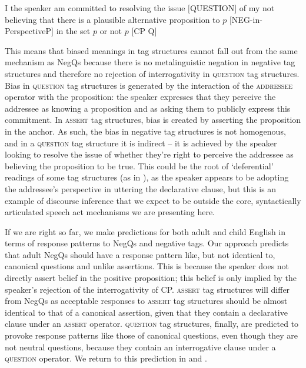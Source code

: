 \documentclass[output=paper,colorlinks,citecolor=brown]{langscibook}
\begin{document}
\ea I the speaker am committed to resolving the issue $[$QUESTION$]$ of my not believing that there is a plausible alternative proposition to $p$ $[$NEG-in-PerspectiveP$]$ in the set $p$ or not $p$ $[$CP Q$]$
\z

This means that biased meanings in tag structures cannot fall out from the same mechanism as NegQs because there is no metalinguistic negation in negative tag structures and therefore no rejection of interrogativity in \textsc{question} tag structures. Bias in \textsc{question} tag structures is generated by the interaction of the \textsc{addressee} operator with the proposition: the speaker expresses that they perceive the addressee as knowing a proposition and as asking them to publicly express this commitment. In \textsc{assert} tag structures, bias is created by asserting the proposition in the anchor. As such, the bias in negative tag structures is not homogenous, and in a \textsc{question} tag structure it is indirect -- it is achieved by the speaker looking to resolve the issue of whether they're right to perceive the addressee as believing the proposition to be true. This could be the root of `deferential' readings of some tag structures (as in \citealt{lakoffr1975}), as the speaker appears to be adopting the addressee's perspective in uttering the declarative clause, but this is an example of discourse inference that we expect to be outside the core, syntactically articulated speech act mechanisms we are presenting here.

If we are right so far, we make predictions for both adult and child English in terms of response patterns to NegQs and negative tags. Our approach predicts that adult NegQs should have a response pattern like, but not identical to, canonical questions and unlike assertions. This is because the speaker does not directly assert belief in the positive proposition; this belief is only implied by the speaker's rejection of the interrogativity of CP. \textsc{assert} tag structures will differ from NegQs as acceptable responses to \textsc{assert} tag structures should be almost identical to that of a canonical assertion, given that they contain a declarative clause under an \textsc{assert} operator. \textsc{question} tag structures, finally, are predicted to provoke response patterns like those of canonical questions, even though they are not neutral questions, because they contain an interrogative clause under a \textsc{question} operator. We return to this prediction in  and . 
\end{document}
